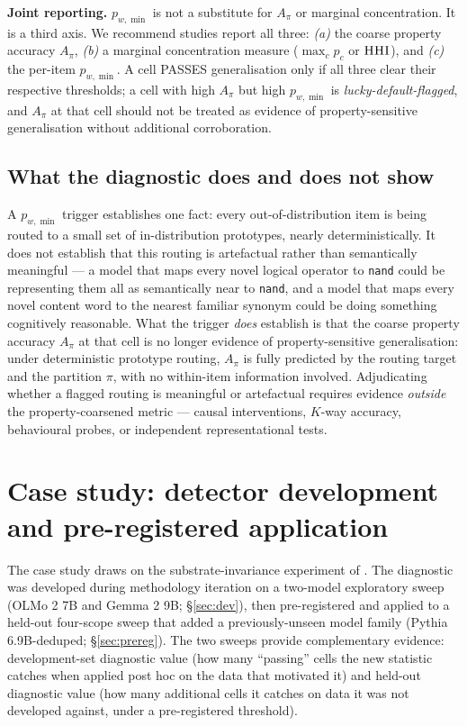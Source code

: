 \documentclass[11pt,letterpaper]{article}
\newcommand{\pwmin}{\texorpdfstring{\ensuremath{p_{w,\min}}}{p\_(w,min)}}
\newcommand{\hhi}{\textsc{HHI}}
\begin{document}
\textbf{Joint reporting.} \pwmin{} is not a substitute for $A_\pi$ or
marginal concentration. It is a third axis. We recommend studies
report all three: \emph{(a)} the coarse property accuracy
$A_\pi$, \emph{(b)} a marginal concentration measure
($\max_c p_c$ or $\hhi$), and \emph{(c)} the per-item \pwmin. A
cell PASSES generalisation only if all three clear their respective
thresholds; a cell with high $A_\pi$ but high \pwmin{} is
\emph{lucky-default-flagged}, and $A_\pi$ at that cell should not be
treated as evidence of property-sensitive generalisation without
additional corroboration.

\subsection{What the diagnostic does and does not show}
\label{sec:scope}

A \pwmin{} trigger establishes one fact: every out-of-distribution
item is being routed to a small set of in-distribution prototypes,
nearly deterministically. It does not establish that this routing
is artefactual rather than semantically meaningful --- a model that
maps every novel logical operator to \texttt{nand} could be
representing them all as semantically near to \texttt{nand}, and a
model that maps every novel content word to the nearest familiar
synonym could be doing something cognitively reasonable. What the
trigger \emph{does} establish is that the coarse property accuracy
$A_\pi$ at that cell is no longer evidence of property-sensitive
generalisation: under deterministic prototype routing, $A_\pi$ is
fully predicted by the routing target and the partition $\pi$, with
no within-item information involved. Adjudicating whether a
flagged routing is meaningful or artefactual requires evidence
\emph{outside} the property-coarsened metric --- causal
interventions, $K$-way accuracy, behavioural probes, or independent
representational tests.

\section{Case study: detector development and pre-registered application}
\label{sec:casestudy}

The case study draws on the substrate-invariance experiment of
\citet{budworth2026substrate}. The diagnostic was developed during
methodology iteration on a two-model exploratory sweep (OLMo 2 7B and
Gemma 2 9B; \S\ref{sec:dev}), then pre-registered and applied to a
held-out four-scope sweep that added a previously-unseen model
family (Pythia 6.9B-deduped; \S\ref{sec:prereg}). The two sweeps
provide complementary evidence: development-set diagnostic value
(how many ``passing'' cells the new statistic catches when applied
post hoc on the data that motivated it) and held-out diagnostic
value (how many additional cells it catches on data it was not
developed against, under a pre-registered threshold).
\end{document}
